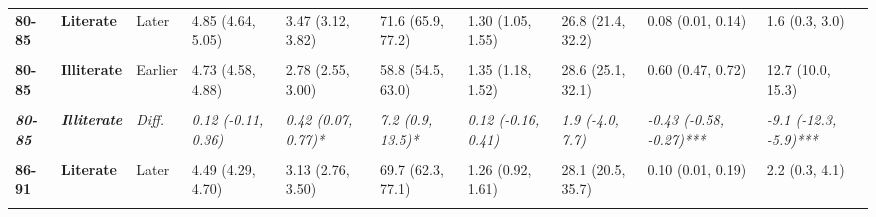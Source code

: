 \begin{table}[!h]
{{\begin{tabular}[t]{>{}l>{}lllllllll}
\cmidrule{1-10}
\textbf{80-85} & \textbf{Literate} & Later & 4.85 (4.64, 5.05) & 3.47 (3.12, 3.82) & 71.6 (65.9, 77.2) & 1.30 (1.05, 1.55) & 26.8 (21.4, 32.2) & 0.08 (0.01, 0.14) & 1.6 (0.3, 3.0)\\
\cmidrule{1-10}
\em{\textbf{\cellcolor{gray!10}{80-85}}} & \em{\textbf{\cellcolor{gray!10}{Literate}}} & \em{\cellcolor{gray!10}{Diff.}} & \em{\cellcolor{gray!10}{0.03 (-0.24, 0.30)}} & \em{\cellcolor{gray!10}{0.74 (0.29, 1.19)**}} & \em{\cellcolor{gray!10}{14.8 (6.6, 23.0)***}} & \em{\cellcolor{gray!10}{-0.41 (-0.79, -0.04)*}} & \em{\cellcolor{gray!10}{-8.8 (-16.5, -1.1)*}} & \em{\cellcolor{gray!10}{-0.29 (-0.46, -0.11)**}} & \em{\cellcolor{gray!10}{-6.0 (-9.6, -2.4)***}}\\
\cmidrule{1-10}
\textbf{80-85} & \textbf{Illiterate} & Earlier & 4.73 (4.58, 4.88) & 2.78 (2.55, 3.00) & 58.8 (54.5, 63.0) & 1.35 (1.18, 1.52) & 28.6 (25.1, 32.1) & 0.60 (0.47, 0.72) & 12.7 (10.0, 15.3)\\
\cmidrule{1-10}
\textbf{\cellcolor{gray!10}{80-85}} & \textbf{\cellcolor{gray!10}{Illiterate}} & \cellcolor{gray!10}{Later} & \cellcolor{gray!10}{4.85 (4.67, 5.03)} & \cellcolor{gray!10}{3.20 (2.93, 3.47)} & \cellcolor{gray!10}{66.0 (61.3, 70.7)} & \cellcolor{gray!10}{1.47 (1.25, 1.70)} & \cellcolor{gray!10}{30.4 (25.7, 35.1)} & \cellcolor{gray!10}{0.17 (0.09, 0.26)} & \cellcolor{gray!10}{3.6 (1.8, 5.4)}\\
\cmidrule{1-10}
\em{\textbf{80-85}} & \em{\textbf{Illiterate}} & \em{Diff.} & \em{0.12 (-0.11, 0.36)} & \em{0.42 (0.07, 0.77)*} & \em{7.2 (0.9, 13.5)*} & \em{0.12 (-0.16, 0.41)} & \em{1.9 (-4.0, 7.7)} & \em{-0.43 (-0.58, -0.27)***} & \em{-9.1 (-12.3, -5.9)***}\\
\cmidrule{1-10}
\textbf{\cellcolor{gray!10}{86-91}} & \textbf{\cellcolor{gray!10}{Literate}} & \cellcolor{gray!10}{Earlier} & \cellcolor{gray!10}{4.00 (3.79, 4.22)} & \cellcolor{gray!10}{2.44 (2.13, 2.76)} & \cellcolor{gray!10}{61.1 (54.2, 67.9)} & \cellcolor{gray!10}{1.37 (1.10, 1.63)} & \cellcolor{gray!10}{34.1 (27.7, 40.5)} & \cellcolor{gray!10}{0.19 (0.04, 0.34)} & \cellcolor{gray!10}{4.8 (1.0, 8.6)}\\
\cmidrule{1-10}
\textbf{86-91} & \textbf{Literate} & Later & 4.49 (4.29, 4.70) & 3.13 (2.76, 3.50) & 69.7 (62.3, 77.1) & 1.26 (0.92, 1.61) & 28.1 (20.5, 35.7) & 0.10 (0.01, 0.19) & 2.2 (0.3, 4.1)\\
\cmidrule{1-10}
\em{\textbf{\cellcolor{gray!10}{86-91}}} & \em{\textbf{\cellcolor{gray!10}{Literate}}} & \em{\cellcolor{gray!10}{Diff.}} & \em{\cellcolor{gray!10}{0.49 (0.19, 0.79)**}} & \em{\cellcolor{gray!10}{0.69 (0.20, 1.17)**}} & \em{\cellcolor{gray!10}{8.6 (-1.5, 18.7)}} & \em{\cellcolor{gray!10}{-0.10 (-0.53, 0.33)}} & \em{\cellcolor{gray!10}{-6.0 (-15.9, 3.9)}} & \em{\cellcolor{gray!10}{-0.09 (-0.27, 0.08)}} & \em{\cellcolor{gray!10}{-2.6 (-6.9, 1.6)}}\\

\end{tabular}}}
\end{table}

